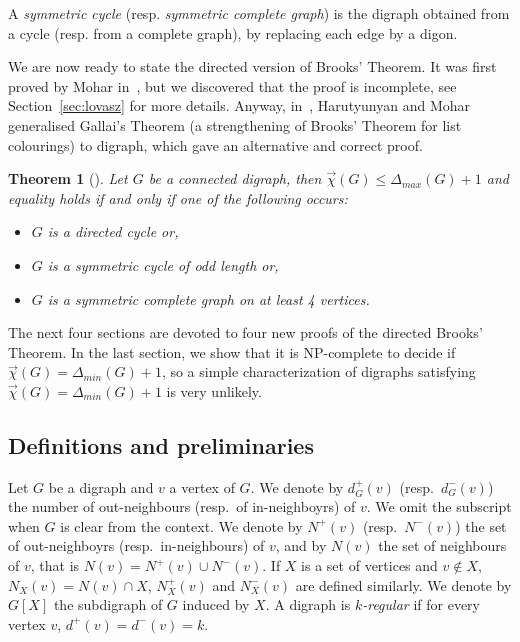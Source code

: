 \documentclass[11pt]{article}
\newtheorem{theorem}[lemma]{Theorem}
\newcommand{\dic}{\vec{\chi}}
\newcommand{\dmin}{\Delta_{min}}
\begin{document}


A \emph{symmetric cycle} (resp. \emph{symmetric complete graph}) is the digraph obtained from a cycle (resp. from a complete graph), by replacing each edge by a digon.


We are now ready to state the  directed version of Brooks' Theorem. 
It was first proved by Mohar in~\cite{M10}, but we discovered that the proof is incomplete, see Section~\ref{sec:lovasz} for more details. Anyway, in~\cite{HMGallai}, Harutyunyan and Mohar generalised Gallai's Theorem  (a strengthening of Brooks' Theorem for list colourings) to digraph, which gave an alternative and correct proof. 

\begin{theorem}[\cite{M10, HMGallai}]\label{brooks_max_oriented}
Let $G$ be a connected digraph, then $\dic(G) \leq \Delta_{max}(G) + 1$ and equality holds if and only if one of the following occurs:
\begin{itemize}
\item[(a)] $G$ is a directed cycle or,
\item[(b)] $G$ is a symmetric cycle of odd length or,
\item[(c)] $G$ is a symmetric complete graph on at least 4 vertices.
\end{itemize}
\end{theorem}


The next four sections are devoted to four new proofs of the directed Brooks' Theorem. 
In the last section, we show that  it is NP-complete to decide if $\dic(G) = \Delta_{min}(G) +1$, so a simple characterization of digraphs satisfying $\dic(G) = \dmin(G) +1$ is very unlikely. 


\subsection{Definitions and preliminaries} \label{subsec:def}
Let $G$ be a digraph and $v$ a vertex of $G$. 
We denote by $d_G^+(v)$ (resp.~$d_G^-(v)$) the number of out-neighbours (resp.~of in-neighboyrs) of $v$. We omit the subscript when $G$ is clear from the context.  
We denote by $N^+(v)$ (resp.~$N^-(v)$) the set of out-neighboyrs (resp.~in-neighbours) of $v$,  and by $N(v)$ the set of neighbours of $v$, that is $N(v) = N^+(v) \cup N^-(v)$. If $X$ is a set of vertices and $v \notin X$, $N_X(v) = N(v) \cap X$, $N^+_X(v)$ and $N^-_X(v)$ are defined similarly. We denote by $G[X]$ the subdigraph of $G$ induced by $X$. 
A digraph is \emph{$k$-regular} if for every vertex $v$, $d^+(v)=d^-(v)=k$. 
\medskip
\end{document}
